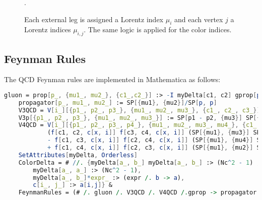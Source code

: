 \documentclass[main.tex]{subfiles}
\begin{document}
\begin{figure}[htb]
\begin{subfigure}[b]{0.33\textwidth}
    \end{subfigure}
    \caption{Each external leg is assigned a Lorentz index $\mu_i$ and each vertex $j$ a Lorentz indices $\mu_{i,j}$. The same logic is applied for the color indices.} .
    \label{fig:lorentz encoding}
\end{figure}

\subsection{Feynman Rules}

The QCD Feynman rules are implemented in Mathematica as follows:

\begin{lstlisting}[language=Mathematica,caption = {Feynman rules for QCD}, label = {lst:feynman-rules}]
    gluon = prop[p_, {mu1_, mu2_}, {c1_,c2_}] :> -I myDelta[c1, c2] gprop[p, mu1, mu2];
    propagator[p_, mu1_, mu2_] := SP[{mu1}, {mu2}]/SP[p, p]
    V3QCD = V[i_][{p1_, p2_, p3_}, {mu1_, mu2_, mu3_}, {c1_, c2_, c3_}] :> -g f[c1, c2, c3] V3Lorentz[{p1, p2, p3}, {mu1, mu2, mu3}]
    V3p[{p1_, p2_, p3_}, {mu1_, mu2_, mu3_}] := SP[p1 - p2, {mu3}] SP[{mu1}, {mu2}] + SP[p2 - p3, {mu1}] SP[{mu2}, {mu3}] + SP[p3 - p1, {mu2}] SP[{mu3}, {mu1}]
    V4QCD = V[i_][{p1_, p2_, p3_, p4_}, {mu1_, mu2_, mu3_, mu4_}, {c1_, c2_, c3_, c4_}] :> -I g^2 
            (f[c1, c2, c[x, i]] f[c3, c4, c[x, i]] (SP[{mu1}, {mu3}] SP[{mu2}, {mu4}] - SP[{mu1}, {mu4}] SP[{mu2}, {mu3}]) 
            - f[c1, c3, c[x, i]] f[c2, c4, c[x, i]] (SP[{mu1}, {mu4}] SP[{mu2}, {mu3}] - SP[{mu1}, {mu2}] SP[{mu3}, {mu4}]) 
            + f[c1, c4, c[x, i]] f[c2, c3, c[x, i]] (SP[{mu1}, {mu2}] SP[{mu3}, {mu4}] - SP[{mu1}, {mu3}] SP[{mu2}, {mu4}]))
    SetAttributes[myDelta, Orderless]
    ColorDelta = # //. {myDelta[a_, b_] myDelta[a_, b_] :> (Nc^2 - 1) ,
        myDelta[a_, a_] :> (Nc^2 - 1),
        myDelta[a_, b_]*expr_ :> (expr /. b -> a),
        c[i_, j_] :> a[i,j]} &
    FeynmanRules = (# /. gluon /. V3QCD /. V4QCD /.gprop -> propagator /. V3Lorentz -> V3p // ColorDelta // antisymf // Expand) &
\end{lstlisting}
\end{document}
